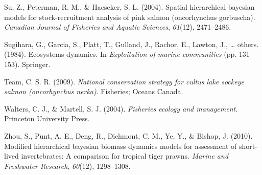 \documentclass[12pt,]{scrartcl}
\begin{document}
\hypertarget{ref-su2004spatial}{}
Su, Z., Peterman, R. M., \& Haeseker, S. L. (2004). Spatial hierarchical
bayesian models for stock-recruitment analysis of pink salmon
(oncorhynchus gorbuscha). \emph{Canadian Journal of Fisheries and
Aquatic Sciences}, \emph{61}(12), 2471--2486.

\hypertarget{ref-sugihara1984ecosystems}{}
Sugihara, G., Garcia, S., Platt, T., Gulland, J., Rachor, E., Lawton,
J., \ldots{} others. (1984). Ecosystems dynamics. In \emph{Exploitation
of marine communities} (pp. 131--153). Springer.

\hypertarget{ref-team2009national}{}
Team, C. S. R. (2009). \emph{National conservation strategy for cultus
lake sockeye salmon (oncorhynchus nerka)}. Fisheries; Oceans Canada.

\hypertarget{ref-walters2004fisheries}{}
Walters, C. J., \& Martell, S. J. (2004). \emph{Fisheries ecology and
management}. Princeton University Press.

\hypertarget{ref-zhou2010modified}{}
Zhou, S., Punt, A. E., Deng, R., Dichmont, C. M., Ye, Y., \& Bishop, J.
(2010). Modified hierarchical bayesian biomass dynamics models for
assessment of short-lived invertebrates: A comparison for tropical tiger
prawns. \emph{Marine and Freshwater Research}, \emph{60}(12),
1298--1308.
\end{document}
